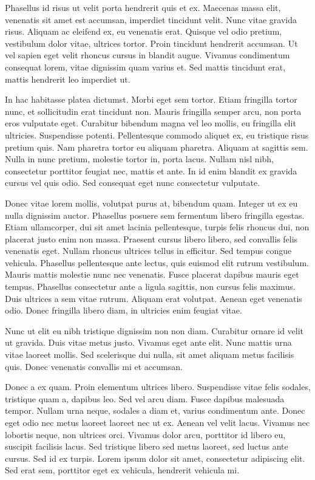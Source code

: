 \documentclass[a4paper,
	11pt,
	parskip=full,
	bibliography=totoc,
	twoside
	]{scrartcl}
\begin{document}
	Phasellus id risus ut velit porta hendrerit quis et ex. Maecenas massa elit, venenatis sit amet est accumsan, imperdiet tincidunt velit. Nunc vitae gravida risus. Aliquam ac eleifend ex, eu venenatis erat. Quisque vel odio pretium, vestibulum dolor vitae, ultrices tortor. Proin tincidunt hendrerit accumsan. Ut vel sapien eget velit rhoncus cursus in blandit augue. Vivamus condimentum consequat lorem, vitae dignissim quam varius et. Sed mattis tincidunt erat, mattis hendrerit leo imperdiet ut.
	
	In hac habitasse platea dictumst. Morbi eget sem tortor. Etiam fringilla tortor nunc, et sollicitudin erat tincidunt non. Mauris fringilla semper arcu, non porta eros vulputate eget. Curabitur bibendum magna vel leo mollis, eu fringilla elit ultricies. Suspendisse potenti. Pellentesque commodo aliquet ex, eu tristique risus pretium quis. Nam pharetra tortor eu aliquam pharetra. Aliquam at sagittis sem. Nulla in nunc pretium, molestie tortor in, porta lacus. Nullam nisl nibh, consectetur porttitor feugiat nec, mattis et ante. In id enim blandit ex gravida cursus vel quis odio. Sed consequat eget nunc consectetur vulputate.
	
	Donec vitae lorem mollis, volutpat purus at, bibendum quam. Integer ut ex eu nulla dignissim auctor. Phasellus posuere sem fermentum libero fringilla egestas. Etiam ullamcorper, dui sit amet lacinia pellentesque, turpis felis rhoncus dui, non placerat justo enim non massa. Praesent cursus libero libero, sed convallis felis venenatis eget. Nullam rhoncus ultrices tellus in efficitur. Sed tempus congue vehicula. Phasellus pellentesque ante lectus, quis euismod elit rutrum vestibulum. Mauris mattis molestie nunc nec venenatis. Fusce placerat dapibus mauris eget tempus. Phasellus consectetur ante a ligula sagittis, non cursus felis maximus. Duis ultrices a sem vitae rutrum. Aliquam erat volutpat. Aenean eget venenatis odio. Donec fringilla libero diam, in ultricies enim feugiat vitae.
	
	Nunc ut elit eu nibh tristique dignissim non non diam. Curabitur ornare id velit ut gravida. Duis vitae metus justo. Vivamus eget ante elit. Nunc mattis urna vitae laoreet mollis. Sed scelerisque dui nulla, sit amet aliquam metus facilisis quis. Donec venenatis convallis mi et accumsan.
	
	Donec a ex quam. Proin elementum ultrices libero. Suspendisse vitae felis sodales, tristique quam a, dapibus leo. Sed vel arcu diam. Fusce dapibus malesuada tempor. Nullam urna neque, sodales a diam et, varius condimentum ante. Donec eget odio nec metus laoreet laoreet nec ut ex. Aenean vel velit lacus. Vivamus nec lobortis neque, non ultrices orci. Vivamus dolor arcu, porttitor id libero eu, suscipit facilisis lacus. Sed tristique libero sed metus laoreet, sed luctus ante cursus. Sed id ex turpis. Lorem ipsum dolor sit amet, consectetur adipiscing elit. Sed erat sem, porttitor eget ex vehicula, hendrerit vehicula mi.
	
\end{document}
